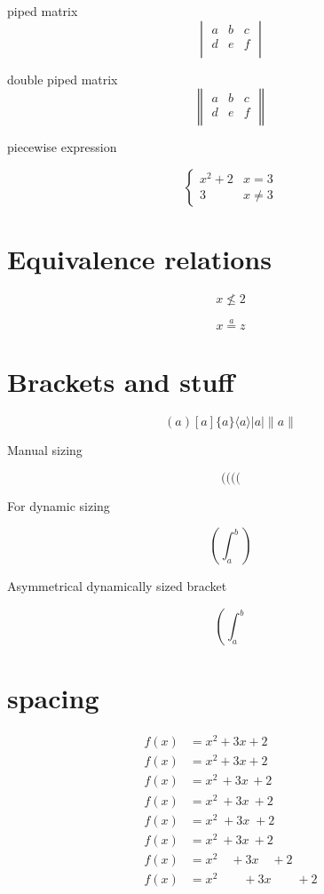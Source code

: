 \documentclass[12pt]{report}
\begin{document}
piped matrix 
$$\begin{vmatrix}
a & b & c \\
d & e & f \\
\end{vmatrix}$$

double piped matrix 
$$\begin{Vmatrix}
a & b & c \\
d & e & f \\
\end{Vmatrix}$$

piecewise expression 

$$\begin{cases}
x^2 + 2 & x = 3\\
3 & x \neq 3
\end{cases}$$

\section{Equivalence relations}
$$x \not \leq 2$$ %

$$x \stackrel{a}{=} z$$ %

\section{Brackets and stuff}
$$(a) [a] \{a\} \langle a\rangle |a| \|a\|$$ %

Manual sizing 

$$\big( \Big( \bigg( \Bigg($$

For dynamic sizing

$$\left(\int_a^b\right)$$ %

Asymmetrical dynamically sized bracket 

$$\left(\int_a^b\right.$$ %

\section{spacing}
\begin{align*}
f(x) &= x^2\! +3x\! +2 \\
f(x) &= x^2+3x+2 \\
f(x) &= x^2\, +3x\, +2 \\
f(x) &= x^2\: +3x\: +2 \\
f(x) &= x^2\; +3x\; +2 \\
f(x) &= x^2\ +3x\ +2 \\
f(x) &= x^2\quad +3x\quad +2 \\
f(x) &= x^2\qquad +3x\qquad +2
\end{align*}
\end{document}
